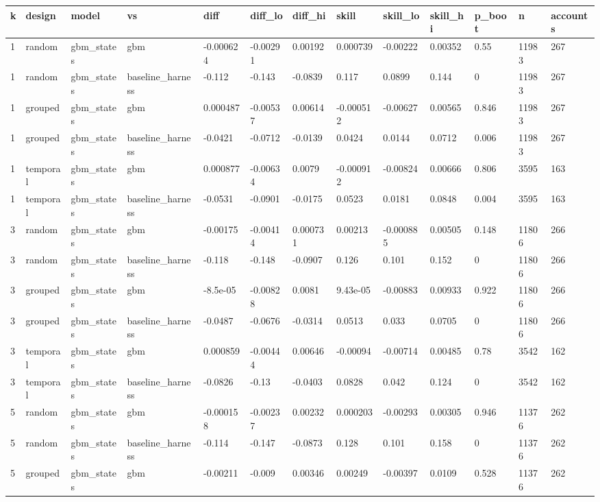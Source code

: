 \begin{tabular}{lllllllllllll}
\toprule
k & design & model & vs & diff & diff\_lo & diff\_hi & skill & skill\_lo & skill\_hi & p\_boot & n & accounts \\
\midrule
1 & random & gbm\_states & gbm & -0.000624 & -0.00291 & 0.00192 & 0.000739 & -0.00222 & 0.00352 & 0.55 & 11983 & 267 \\
1 & random & gbm\_states & baseline\_harness & -0.112 & -0.143 & -0.0839 & 0.117 & 0.0899 & 0.144 & 0 & 11983 & 267 \\
1 & grouped & gbm\_states & gbm & 0.000487 & -0.00537 & 0.00614 & -0.000512 & -0.00627 & 0.00565 & 0.846 & 11983 & 267 \\
1 & grouped & gbm\_states & baseline\_harness & -0.0421 & -0.0712 & -0.0139 & 0.0424 & 0.0144 & 0.0712 & 0.006 & 11983 & 267 \\
1 & temporal & gbm\_states & gbm & 0.000877 & -0.00634 & 0.0079 & -0.000912 & -0.00824 & 0.00666 & 0.806 & 3595 & 163 \\
1 & temporal & gbm\_states & baseline\_harness & -0.0531 & -0.0901 & -0.0175 & 0.0523 & 0.0181 & 0.0848 & 0.004 & 3595 & 163 \\
3 & random & gbm\_states & gbm & -0.00175 & -0.00414 & 0.000731 & 0.00213 & -0.000885 & 0.00505 & 0.148 & 11806 & 266 \\
3 & random & gbm\_states & baseline\_harness & -0.118 & -0.148 & -0.0907 & 0.126 & 0.101 & 0.152 & 0 & 11806 & 266 \\
3 & grouped & gbm\_states & gbm & -8.5e-05 & -0.00828 & 0.0081 & 9.43e-05 & -0.00883 & 0.00933 & 0.922 & 11806 & 266 \\
3 & grouped & gbm\_states & baseline\_harness & -0.0487 & -0.0676 & -0.0314 & 0.0513 & 0.033 & 0.0705 & 0 & 11806 & 266 \\
3 & temporal & gbm\_states & gbm & 0.000859 & -0.00444 & 0.00646 & -0.00094 & -0.00714 & 0.00485 & 0.78 & 3542 & 162 \\
3 & temporal & gbm\_states & baseline\_harness & -0.0826 & -0.13 & -0.0403 & 0.0828 & 0.042 & 0.124 & 0 & 3542 & 162 \\
5 & random & gbm\_states & gbm & -0.000158 & -0.00237 & 0.00232 & 0.000203 & -0.00293 & 0.00305 & 0.946 & 11376 & 262 \\
5 & random & gbm\_states & baseline\_harness & -0.114 & -0.147 & -0.0873 & 0.128 & 0.101 & 0.158 & 0 & 11376 & 262 \\
5 & grouped & gbm\_states & gbm & -0.00211 & -0.009 & 0.00346 & 0.00249 & -0.00397 & 0.0109 & 0.528 & 11376 & 262 \\

\end{tabular}
